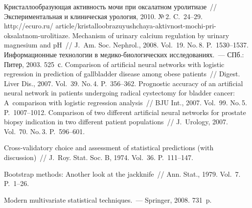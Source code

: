 \begin{multicols}{2}
{{\begin{thebibliography}{99}
Кристаллообразующая активность мочи при оксалатном уролитиазе~//
Экспериментальная и клиническая урология, 2010. №\,2. C.~24--29.
{\sf http://ecuro.ru/ article/kristalloobrazuyushchaya-aktivnost-mochi-pri-oksalatnom-urolitiaze}.
 Mechanism 
of urinary calcium regulation by urinary magnesium and pH~// J.~Am. Soc. Nephrol., 2008. Vol.~19. 
No.\,8. P.~1530--1537.
 Информационные технологии в 
ме\-ди\-ко-био\-ло\-ги\-че\-ских исследованиях.~--- СПб.: Питер, 2003. 525~с.
 Comparison of artificial neural networks with 
logistic regression in prediction of gallbladder disease among obese patients~// Digest. Liver Dis., 2007. 
Vol.~39. No.\,4. P.~356--362.
 Prognostic accuracy of an artificial neural 
network in patients undergoing radical cystectomy for bladder cancer: A~comparison with logistic 
regression analysis~// BJU Int., 2007. Vol.~99. No.\,5. P.~1007--1012.
 Comparison of two different artificial neural 
networks for prostate biopsy indication in two different patient populations~// J.~Urology, 2007. 
Vol.~70. No.\,3. P.~596--601.


 Cross-validatory choice and assessment of statistical predictions (with discussion)~// 
J.~Roy. Stat. Soc. B, 1974. Vol.~36. P.~111--147.

 Bootstrap methods: Another look at the jackknife~// Ann. Stat., 1979. Vol.~7. 
P.~1--26.

 Modern multivariate statistical techniques.~--- Springer, 2008. 731~p. 


\end{thebibliography} } }

\end{multicols}


